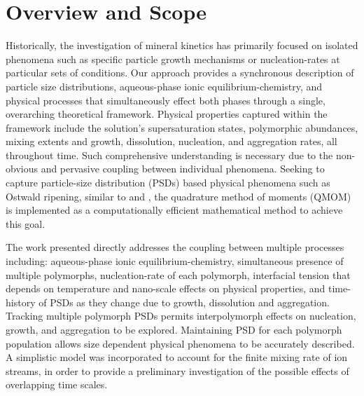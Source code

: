 \documentclass[preprint,3p,a4paper,times,12pt,authoryear]{elsarticle}
\begin{document}
\section{Overview and Scope}
Historically, the investigation of mineral kinetics has primarily focused on isolated phenomena such as specific particle growth mechanisms or nucleation-rates at particular sets of conditions. Our approach provides a synchronous description of particle size distributions, aqueous-phase ionic equilibrium-chemistry, and physical processes that simultaneously effect both phases through a single, overarching theoretical framework.  Physical properties captured within the framework include the solution's supersaturation states, polymorphic abundances, mixing extents and growth, dissolution, nucleation, and aggregation rates, all throughout time.
Such comprehensive understanding is necessary due to the non-obvious and pervasive coupling between individual phenomena.  Seeking to capture particle-size distribution (PSDs) based physical phenomena such as Ostwald ripening, similar to \citet{Steefel1990} and \cite{Noguera2006b}, the quadrature method of moments (QMOM) is implemented as a computationally efficient mathematical method to achieve this goal.


The work presented directly addresses the coupling between multiple processes including: aqueous-phase ionic equilibrium-chemistry, simultaneous presence of multiple polymorphs, nucleation-rate of each polymorph, interfacial tension that depends on temperature and nano-scale effects on physical properties, and time-history of PSDs as they change due to growth, dissolution and aggregation.  Tracking multiple polymorph PSDs permits interpolymorph effects on nucleation, growth, and aggregation to be explored.  Maintaining PSD for each polymorph population allows size dependent physical phenomena to be accurately described.  A simplistic model was incorporated to account for the finite mixing rate of ion streams, in order to provide a preliminary investigation of the possible effects of overlapping time scales. 
\end{document}
